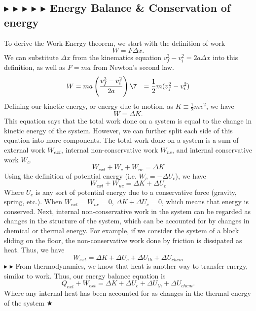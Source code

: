 %
%
\subsection{\color{OrangeRed} $\blacktriangleright$ \color{RoyalBlue} $\blacktriangleright$ \color{PineGreen} $\blacktriangleright$ \color{Goldenrod} $\blacktriangleright$ \color{Orchid} $\blacktriangleright$ \color{black} Energy Balance \& Conservation of energy}
To derive the Work-Energy theorem, we start with the definition of work
\begin{equation}
    W = F\Delta x.
\end{equation}
We can substitute $\Delta x$ from the kinematics equation $v_f^2-v_i^2=2a\Delta x$ into this definition, as well as $F=ma$ from Newton's second law.
\begin{align}
    W &= ma \left(\frac{v_f^2-v_i^2}{2a}\right) \7
    &= \frac12 m(v_f^2-v_i^2)
\end{align}
Defining our kinetic energy, or energy due to motion, as $K \equiv \tfrac12mv^2$, we have
\begin{equation}
    \boxed{W=\Delta K}.
\end{equation}
This equation says that the total work done on a system is equal to the change in kinetic energy of the system. However, we can further split each side of this equation into more components. The total work done on a system is a sum of external work $W_{ext}$, internal non-conservative work $W_{nc}$, and internal conservative work $W_c$.
\begin{equation}
    W_{ext} + W_c + W_{nc} = \Delta K
\end{equation}
Using the definition of potential energy (i.e. $W_c = -\Delta U_c$), we have
\begin{equation}
    W_{ext} + W_{nc} = \Delta K + \Delta U_c
\end{equation}
Where $U_c$ is any sort of potential energy due to a conservative force (gravity, spring, etc.). When $W_{ext} = W_{nc} = 0$, $\Delta K + \Delta U_c = 0$, which means that energy is conserved. Next, internal non-conservative work in the system can be regarded as changes in the structure of the system, which can be accounted for by changes in chemical or thermal energy. For example, if we consider the system of a block sliding on the floor, the non-conservative work done by friction is dissipated as heat. Thus, we have
\begin{equation}
    \boxed{W_{ext} = \Delta K + \Delta U_c + \Delta U_{th} + \Delta U_{chem}}
\end{equation}
\noindent\color{RoyalBlue} $\blacktriangleright$ \color{Orchid} $\blacktriangleright$ \color{black} From thermodynamics, we know that heat is another way to transfer energy, similar to work. Thus, our energy balance equation is
\begin{equation}
    \boxed{Q_{ext} + W_{ext} = \Delta K + \Delta U_c + \Delta U_{th} + \Delta U_{chem}}.
\end{equation}
Where any internal heat has been accounted for as changes in the thermal energy of the system $\bigstar$


